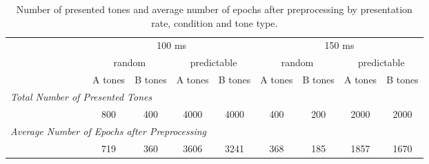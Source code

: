 

\begin{table}
\caption{Number of presented tones and average number of epochs after preprocessing by presentation rate, condition and tone type.}
\centering
\begin{tabular}{lcccccccc} 
\toprule
               & \multicolumn{4}{c}{100 ms}                                   & \multicolumn{4}{c}{150 ms}                                    \\ 
\cmidrule(lr){2-5}\cmidrule(lr){6-9}
                           & \multicolumn{2}{c}{random} & \multicolumn{2}{c}{predictable} & \multicolumn{2}{c}{random} & \multicolumn{2}{c}{predictable}  \\ 
\cmidrule(lr){2-3}\cmidrule(lr){4-5}\cmidrule(lr){6-7}\cmidrule(lr){8-9}
                           & A tones & B tones          & A tones & B tones               & A tones & B tones          & A tones & B tones                \\
\midrule
\multicolumn{8}{l}{\textit{Total Number of Presented Tones}}                    \\
& 800     & 400              & 4000   & 4000                 & 400     & 200              & 2000    & 2000                  \\
\multicolumn{8}{l}{\textit{Average Number of Epochs after Preprocessing}} \\
& 719     & 360              & 3606    & 3241                  & 368     & 185              & 1857    & 1670                   \\
\bottomrule
\end{tabular}
\end{table}
